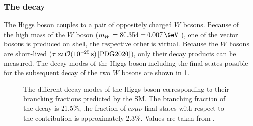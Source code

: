 \subsubsection{The \HWWdet decay}
The Higgs boson couples to a pair of oppositely charged $W$ bosons.
Because of the high mass of the $W$ boson ($m_W = 80.354 \pm 0.007\,\GeV$ \cite{PDG2020}), one of the vector bosons is produced on shell, the respective other is virtual.
Because the $W$ bosons are short-lived ($\tau \approx \mathcal{O}(10^{-25}\,\text{s})\,\text{\cite{PDG2020}}$), only their decay products can be measured. 
The decay modes of the Higgs boson including the final states possible for the subsequent decay of the two $W$ bosons are shown in \cref{fig:h-branching-ratios}. 
\begin{figure}
    \caption{The different decay modes of the Higgs boson corresponding to their branching fractions predicted by the SM. The branching fraction of the \HWW decay is 21.5\%, the fraction of $e\nu\mu\nu$ final states with respect to the \HWW contribution is approximately 2.3\%. Values are taken from .}
    \label{fig:h-branching-ratios}
\end{figure}

